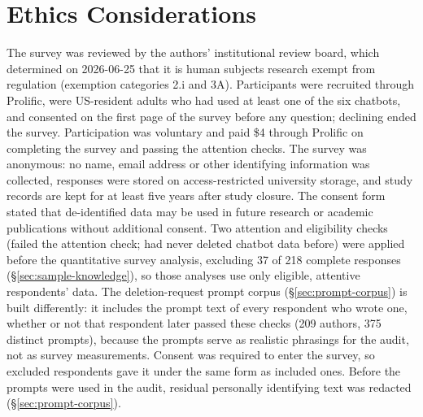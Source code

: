 \documentclass[conference,compsoc]{IEEEtran}
\begin{document}
\section*{Ethics Considerations}
The survey was reviewed by the authors' institutional review board, which
determined on 2026-06-25 that it is human subjects research exempt from
regulation (exemption categories 2.i and 3A). Participants were recruited through Prolific, were
US-resident adults who had used at least one of the six chatbots, and
consented on the first page of the survey before any question; declining
ended the survey. Participation was voluntary and paid \$4 through
Prolific on completing the survey and passing the attention checks. The
survey was anonymous: no name, email address or other identifying
information was collected, responses were stored on access-restricted
university storage, and study records are kept for at least five years after
study closure. The consent form stated that de-identified data may be used
in future research or academic publications without additional consent.
Two attention and eligibility checks (failed the attention check; had never
deleted chatbot data before) were applied before the quantitative survey
analysis, excluding 37 of 218 complete responses
(\S\ref{sec:sample-knowledge}), so those analyses use only eligible,
attentive respondents' data. The deletion-request prompt corpus
(\S\ref{sec:prompt-corpus}) is built differently: it includes the prompt
text of every respondent who wrote one, whether or not that respondent later
passed these checks (209 authors, 375 distinct prompts), because the prompts
serve as realistic phrasings for the audit, not as survey measurements.
Consent was required to enter the survey, so excluded respondents gave it
under the same form as included ones. Before the prompts were used in the
audit, residual personally identifying text was redacted (\S\ref{sec:prompt-corpus}).
\end{document}
